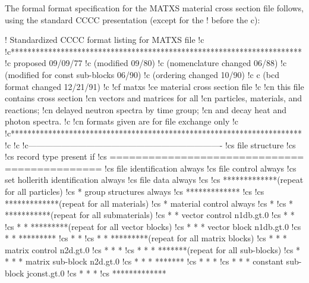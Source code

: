 The formal format specification for the MATXS material cross
section file follows, using the standard CCCC presentation
(except for the ! before the c):

\small
\begin{ccode}

!          Standardized CCCC format listing for MATXS file
!c
!c**********************************************************************
!c               proposed 09/09/77
!c                       (modified 09/80)
!c                       (nomenclature changed 06/88)
!c                       (modified for const sub-blocks 06/90)
!c                       (ordering changed 10/90)
!c     c                       (bcd format changed 12/21/91)
!c
!cf           matxs
!ce           material cross section file
!c
!cn                       this file contains cross section
!cn                       vectors and matrices for all
!cn                       particles, materials, and reactions;
!cn                       delayed neutron spectra by time group;
!cn                       and decay heat and photon spectra.
!c
!cn           formats given are for file exchange only
!c
!c**********************************************************************
!c
!c
!c----------------------------------------------------------------------
!cs          file structure
!cs
!cs              record type                       present if
!cs              ==============================    ===============
!cs              file identification                 always
!cs              file control                        always
!cs              set hollerith identification        always
!cs              file data                           always
!cs
!cs   *************(repeat for all particles)
!cs   *          group structures                    always
!cs   *************
!cs
!cs   *************(repeat for all materials)
!cs   *          material control                    always
!cs   *
!cs   * ***********(repeat for all submaterials)
!cs   * *        vector control                      n1db.gt.0
!cs   * *
!cs   * * *********(repeat for all vector blocks)
!cs   * * *      vector block                        n1db.gt.0
!cs   * * *********
!cs   * *
!cs   * * *********(repeat for all matrix blocks)
!cs   * * *      matrix control                      n2d.gt.0
!cs   * * *
!cs   * * * *******(repeat for all sub-blocks)
!cs   * * * *    matrix sub-block                    n2d.gt.0
!cs   * * * *******
!cs   * * *
!cs   * * *      constant sub-block                  jconst.gt.0
!cs   * * *
!cs   *************

\end{ccode}
